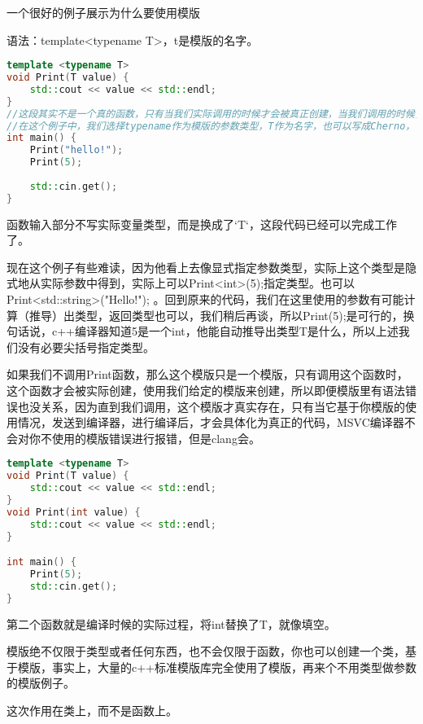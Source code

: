 一个很好的例子展示为什么要使用模版

语法：{\ncodestyle template<typename T>}，{\ncodestyle t}是模版的名字。

\begin{lstlisting}[language=c++]
template <typename T>
void Print(T value) {
    std::cout << value << std::endl;
}
//这段其实不是一个真的函数，只有当我们实际调用的时候才会被真正创建，当我们调用的时候，基于传递的参数，这个函数才会被创建出来，并作为源码编译
//在这个例子中，我们选择typename作为模版的参数类型，T作为名字，也可以写成Cherno，他实际是模版的参数名称，我们可以在整个模版代码中使用，替换在例子中出现的类型。
int main() {
    Print("hello!");
    Print(5);
    
    std::cin.get();
}
\end{lstlisting}

函数输入部分不写实际变量类型，而是换成了`T`，这段代码已经可以完成工作了。

现在这个例子有些难读，因为他看上去像显式指定参数类型，实际上这个类型是隐式地从实际参数中得到，实际上可以{\ncodestyle Print<int>(5);}指定类型。也可以{\ncodestyle Print<std::string>("Hello!");} 。回到原来的代码，我们在这里使用的参数有可能计算（推导）出类型，返回类型也可以，我们稍后再谈，所以{\ncodestyle Print(5);}是可行的，换句话说，c++编译器知道5是一个{\ncodestyle int}，他能自动推导出类型T是什么，所以上述我们没有必要尖括号指定类型。

如果我们不调用Print函数，那么这个模版只是一个模版，只有调用这个函数时，这个函数才会被实际创建，使用我们给定的模版来创建，所以即便模版里有语法错误也没关系，因为直到我们调用，这个模版才真实存在，只有当它基于你模版的使用情况，发送到编译器，进行编译后，才会具体化为真正的代码，MSVC编译器不会对你不使用的模版错误进行报错，但是clang会。



\begin{lstlisting}[language=c++]
template <typename T>
void Print(T value) {
    std::cout << value << std::endl;
}
void Print(int value) {
    std::cout << value << std::endl;
}

int main() {
    Print(5);
    std::cin.get(); 
}
\end{lstlisting}

第二个函数就是编译时候的实际过程，将int替换了T，就像填空。

模版绝不仅限于类型或者任何东西，也不会仅限于函数，你也可以创建一个类，基于模版，事实上，大量的c++标准模版库完全使用了模版，再来个不用类型做参数的模版例子。

这次作用在类上，而不是函数上。

